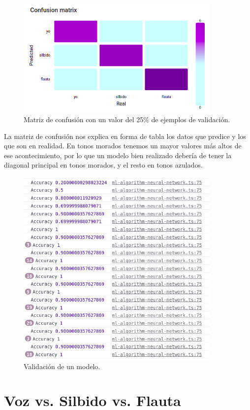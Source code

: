 \documentclass[a4paper, 12pt]{book}
\begin{document}
\begin{figure}
	\centering
	\includegraphics[width=10cm, keepaspectratio]{img/confusion-matrix-25.png}
	\caption{Matriz de confusión con un valor del 25\% de ejemplos de validación.}\label{fig:matriz-confusion}
\end{figure}

La matriz de confusión nos explica en forma de tabla los datos que predice y los que son en realidad. En tonos morados tenemos un mayor valores más altos de ese acontecimiento, por lo que un modelo bien realizado debería de tener la diagonal principal en tonos morados, y el resto en tonos azulados.


\begin{figure}
	\centering
	\includegraphics[width=10cm, keepaspectratio]{img/accuracy2.png}
	\caption{Validación de un modelo.}\label{fig:validacion}
\end{figure}

\section{Voz vs. Silbido vs. Flauta}
\label{sec:yo-silv-flauta}
\end{document}
